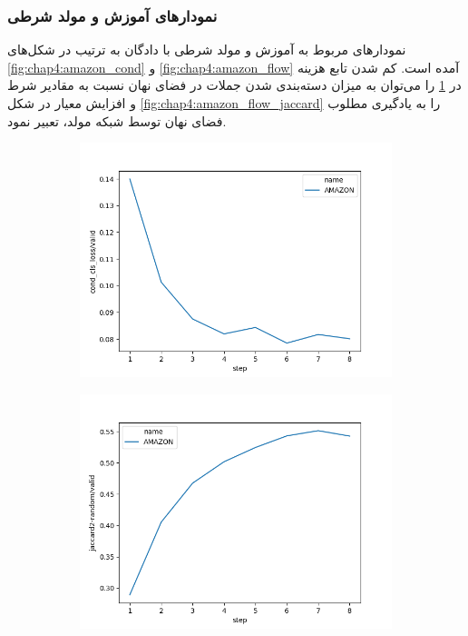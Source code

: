 \subsubsection{نمودار‌های آموزش \wae{} و مولد شرطی}
نمودارهای مربوط به آموزش \wae{} و مولد شرطی با دادگان \amazon{} به ترتیب در شکل‌های \ref{fig:chap4:amazon_cond} و \ref{fig:chap4:amazon_flow} آمده است. کم شدن تابع هزینه در \ref{fig:chap4:amazon_enc_cls} را می‌توان به میزان دسته‌بندی شدن جملات در فضای نهان نسبت به مقادیر شرط و افزایش معیار \jaccard{} در شکل \ref{fig:chap4:amazon_flow_jaccard} را به یادگیری مطلوب فضای نهان توسط شبکه مولد، تعبیر نمود.
\begin{figure}[H]
	\centering
	\begin{subfigure}{0.3\textheight}
		\centering
		\includegraphics[width=1.\textwidth]{images/figs/2020_01_03__19_09_40__cond_cls_loss.png}
		\caption{}
		\label{fig:chap4:amazon_enc_cls}
	\end{subfigure}
	\begin{subfigure}{0.3\textheight}
		\centering
		\includegraphics[width=1.\textwidth]{images/figs/2020_01_03__19_09_40__jaccard2-random.png}

\end{subfigure}
\end{figure}
